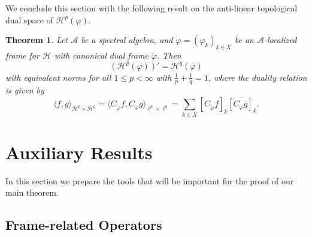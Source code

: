 \documentclass{amsart}
\newtheorem{theorem}{Theorem}
\newtheorem{prop.}[theorem]{Proposition}
\def\Hil{\mathcal{H}}
\def\AAa{{\mathcal A}}
\def\HHmp{{{\mathcal H}_w^p}}
\newcommand{\A}[0]{{\mathcal{A}}}
\def\lukas{\color{blue}}
\begin{document}
We conclude this section with the following result on the anti-linear topological dual space of $\Hil^p(\varphi)$. 

\begin{theorem}\label{duality}\cite[Proposition~2]{xxlgro14}
Let $\A$ be a spectral algebra, and $\varphi =(\varphi_k)_{k\in X}$ be an $\A$-localized frame for $\Hil$ with canonical dual frame $\widetilde{\varphi}$. Then
$$(\Hil^p(\varphi))' = \Hil^q(\varphi)$$
with equivalent norms for all $1\leq p<\infty$ with $\frac{1}{p}+\frac{1}{q}=1$, where the duality relation is given by 
$$\langle f,g \rangle_{\Hil^p\times \Hil^q} = \langle C_{\widetilde{\varphi}}f,C_{\varphi}g \rangle_{\ell^p\times \ell^q} = \sum_{k\in X} \left[C_{\widetilde{\varphi}}f\right]_k \overline{\left[C_{\varphi}g \right]_k}.$$ 
\end{theorem}

\section{Auxiliary Results}\label{Auxiliary Results}

In this section we prepare the tools that will be important for the proof of our main theorem.

\subsection{Frame-related Operators}

\end{document}
